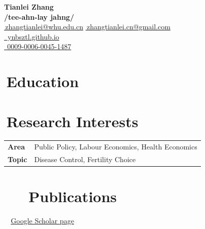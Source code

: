 \documentclass[12pt]{article} %
\newcommand{\mytitle}[5]{
  \begin{center}
    \Large\textbf{#1}\normalsize \\ %
    \href{mailto:#2}{\faEnvelope\,#2} %
    \href{mailto:#3}{\faEnvelope\,#3} \\ %
    \href{#4}{\faGithub\,#4} \\ %
    \href{https://orcid.org/#5}{{\ai }\,#5} %
  \end{center}
}
\begin{document}
\mytitle{Tianlei Zhang \\ \normalsize{\textnormal{/tee-ahn-lay jahng/}}}{zhangtianlei@whu.edu.cn}{zhangtianlei.cn@gmail.com}{ ynbsztl.github.io} %
{0009-0006-0045-1487}



\RaggedRight


\section*{\faMortarBoard\,Education}


%

\section*{\faBullseye\,Research Interests}\label{ri}

\begin{longtable}[l]{@{}p{} p{}}

    \textbf{Area} & Public Policy, Labour Economics, Health Economics \\
    \textbf{Topic} & Disease Control, Fertility Choice  \\
    
\end{longtable}

\section*{{\ai \,\,}\, Publications}
\label{pubs}

\vspace{-.75em}

{\ai }\,~\href{https://scholar.google.com/citations?hl=zh-CN&user=zsO6zkYAAAAJ}{\small Google Scholar page}\\
\normalsize
\end{document}
